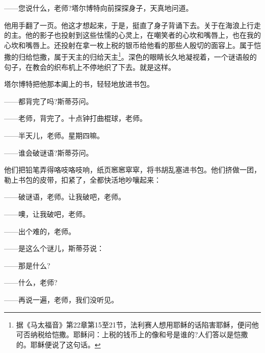 \par ——您说什么，老师?塔尔博特向前探探身子，天真地问道。
\par 他用手翻了一页。他这才想起来，于是，挺直了身子背诵下去。关于在海浪上行走的主。他的影子也投射到这些怯懦的心灵上，在嘲笑者的心坎和嘴唇上，也在我的心坎和嘴唇上。还投射在拿一枚上税的银币给他看的那些人殷切的面容上。属于恺撒的归给恺撒，属于天主的归给天主\footnote{据《马太福音》第22章第15至21节，法利赛人想用耶稣的话陷害耶稣，便问他可否纳税给恺撒。耶稣问：上税的钱币上的像和号是谁的?人们答以是恺撒的。耶稣便说了这句话。}。深色的眼睛长久地凝视着，一个谜语般的句子，在教会的织布机上不停地织了下去。就是这样。
\par 塔尔博特把他那本阖上的书，轻轻地放进书包。
\par ——都背完了吗?斯蒂芬问。
\par ——老师，背完了。十点钟打曲棍球，老师。
\par ——半天儿，老师。星期四嘛。
\par ——谁会破谜语?斯蒂芬问。
\par 他们把铅笔弄得咯吱咯吱响，纸页窸窸窣窣，将书胡乱塞进书包。他们挤做一团，勒上书包的皮带，扣紧了，全都快活地吵嚷起来：
\par ——破谜语，老师。让我破吧，老师。
\par ——噢，让我破吧，老师。
\par ——出个难的，老师。
\par ——是这么个谜儿，斯蒂芬说：
\par ——那是什么?
\par ——什么，老师?
\par ——再说一遍，老师，我们没听见。
